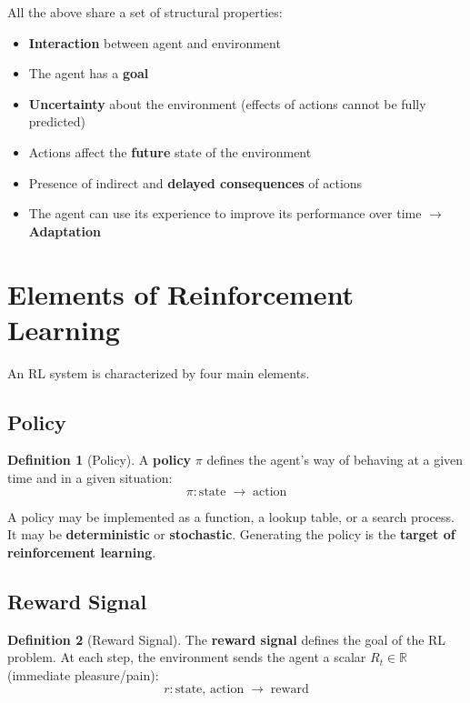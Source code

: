 \documentclass[11pt,a4paper]{article}
\theoremstyle{definition}
\newtheorem{definition}{Definition}[section]
\theoremstyle{plain}
\theoremstyle{remark}
\begin{document}
All the above share a set of structural properties:
\begin{itemize}
    \item \textbf{Interaction} between agent and environment
    \item The agent has a \textbf{goal}
    \item \textbf{Uncertainty} about the environment (effects of actions cannot be fully predicted)
    \item Actions affect the \textbf{future} state of the environment
    \item Presence of indirect and \textbf{delayed consequences} of actions
    \item The agent can use its experience to improve its performance over time $\to$ \textbf{Adaptation}
\end{itemize}


\section{Elements of Reinforcement Learning}

An RL system is characterized by four main elements.

\subsection{Policy}

\begin{definition}[Policy]
A \textbf{policy} $\pi$ defines the agent's way of behaving at a given time and in a given situation:
\[
    \pi: \text{state} \;\to\; \text{action}
\]
\end{definition}

A policy may be implemented as a function, a lookup table, or a search process. It may be \textbf{deterministic} or \textbf{stochastic}. Generating the policy is the \textbf{target of reinforcement learning}.

\subsection{Reward Signal}

\begin{definition}[Reward Signal]
The \textbf{reward signal} defines the goal of the RL problem. At each step, the environment sends the agent a scalar $R_t \in \mathbb{R}$ (immediate pleasure/pain):
\[
    r: \text{state},\, \text{action} \;\to\; \text{reward}
\]
\end{definition}
\end{document}

